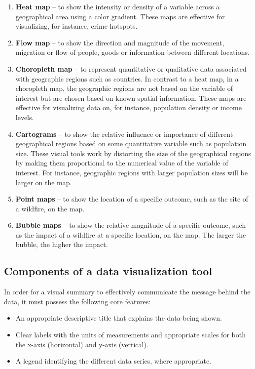 \documentclass[
]{book}
\begin{document}
\begin{enumerate}
  \begin{enumerate}
  \def\labelenumii{\alph{enumii}.}
  \item
    \textbf{Heat map} -- to show the intensity or density of a variable across a geographical area using a color gradient. These maps are effective for visualizing, for instance, crime hotspots.
  \item
    \textbf{Flow map} -- to show the direction and magnitude of the movement, migration or flow of people, goods or information between different locations.
  \item
    \textbf{Choropleth map} -- to represent quantitative or qualitative data associated with geographic regions such as countries. In contrast to a heat map, in a choropleth map, the geographic regions are not based on the variable of interest but are chosen based on known spatial information. These maps are effective for visualizing data on, for instance, population density or income levels.
  \item
    \textbf{Cartograms} -- to show the relative influence or importance of different geographical regions based on some quantitative variable such as population size. These visual tools work by distorting the size of the geographical regions by making them proportional to the numerical value of the variable of interest. For instance, geographic regions with larger population sizes will be larger on the map.
  \item
    \textbf{Point maps} -- to show the location of a specific outcome, such as the site of a wildfire, on the map.
  \item
    \textbf{Bubble maps} -- to show the relative magnitude of a specific outcome, such as the impact of a wildfire at a specific location, on the map. The larger the bubble, the higher the impact. ~
  \end{enumerate}
\end{enumerate}

\subsection{Components of a data visualization tool}\label{components-of-a-data-visualization-tool}

In order for a visual summary to effectively communicate the message behind the data, it must possess the following core features:

\begin{itemize}
\item
  An appropriate descriptive title that explains the data being shown.
\item
  Clear labels with the units of measurements and appropriate scales for both the x-axis (horizontal) and y-axis (vertical).
\item
  A legend identifying the different data series, where appropriate.
\end{itemize}
\end{document}
